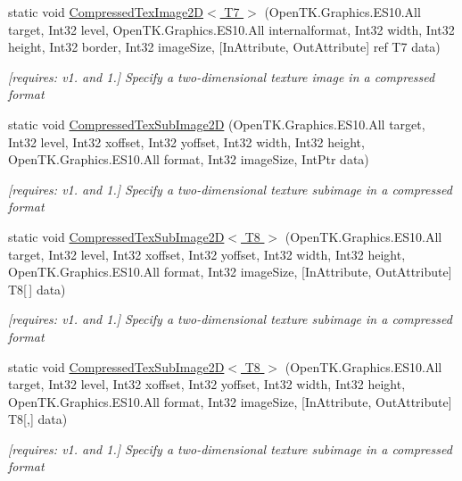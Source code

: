 \begin{DoxyCompactItemize}
static void \hyperlink{class_open_t_k_1_1_graphics_1_1_e_s10_1_1_g_l_a873653c4303a2e8691415dec0924b31b}{Compressed\-Tex\-Image2\-D$<$ T7 $>$} (Open\-T\-K.\-Graphics.\-E\-S10.\-All target, Int32 level, Open\-T\-K.\-Graphics.\-E\-S10.\-All internalformat, Int32 width, Int32 height, Int32 border, Int32 image\-Size, \mbox{[}In\-Attribute, Out\-Attribute\mbox{]} ref T7 data)
\begin{DoxyCompactList}\small\item\em \mbox{[}requires\-: v1. and 1.\mbox{]} Specify a two-\/dimensional texture image in a compressed format \end{DoxyCompactList}\item 
static void \hyperlink{class_open_t_k_1_1_graphics_1_1_e_s10_1_1_g_l_a578dac0241e5cf0d1f3451d9b41cb5f4}{Compressed\-Tex\-Sub\-Image2\-D} (Open\-T\-K.\-Graphics.\-E\-S10.\-All target, Int32 level, Int32 xoffset, Int32 yoffset, Int32 width, Int32 height, Open\-T\-K.\-Graphics.\-E\-S10.\-All format, Int32 image\-Size, Int\-Ptr data)
\begin{DoxyCompactList}\small\item\em \mbox{[}requires\-: v1. and 1.\mbox{]} Specify a two-\/dimensional texture subimage in a compressed format \end{DoxyCompactList}\item 
static void \hyperlink{class_open_t_k_1_1_graphics_1_1_e_s10_1_1_g_l_a5abb84d021f97e9f375fc81e69311dd8}{Compressed\-Tex\-Sub\-Image2\-D$<$ T8 $>$} (Open\-T\-K.\-Graphics.\-E\-S10.\-All target, Int32 level, Int32 xoffset, Int32 yoffset, Int32 width, Int32 height, Open\-T\-K.\-Graphics.\-E\-S10.\-All format, Int32 image\-Size, \mbox{[}In\-Attribute, Out\-Attribute\mbox{]} T8\mbox{[}$\,$\mbox{]} data)
\begin{DoxyCompactList}\small\item\em \mbox{[}requires\-: v1. and 1.\mbox{]} Specify a two-\/dimensional texture subimage in a compressed format \end{DoxyCompactList}\item 
static void \hyperlink{class_open_t_k_1_1_graphics_1_1_e_s10_1_1_g_l_a8bd1f6b8b16d395f8d4b5883640dfc61}{Compressed\-Tex\-Sub\-Image2\-D$<$ T8 $>$} (Open\-T\-K.\-Graphics.\-E\-S10.\-All target, Int32 level, Int32 xoffset, Int32 yoffset, Int32 width, Int32 height, Open\-T\-K.\-Graphics.\-E\-S10.\-All format, Int32 image\-Size, \mbox{[}In\-Attribute, Out\-Attribute\mbox{]} T8\mbox{[},\mbox{]} data)
\begin{DoxyCompactList}\small\item\em \mbox{[}requires\-: v1. and 1.\mbox{]} Specify a two-\/dimensional texture subimage in a compressed format \end{DoxyCompactList}\item 

\end{DoxyCompactItemize}

